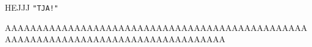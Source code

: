 
HEJJJ \texttt{"TJA!"}


AAAAAAAAAAAAAAAAAAAAAAAAAAAAAAAAAAAAAAAAAAAAAAAAAAAAAAAAAAAAAAAAAAAAAAAAAAAAAAAAAAA